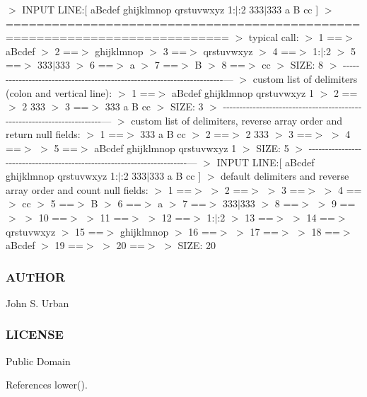 $>$ I\+N\+P\+UT L\+I\+NE\+:\mbox{[} a\+Bcdef ghijklmnop qrstuvwxyz 1\+:$\vert$\+:2 333$\vert$333 a B cc \mbox{]} $>$ =========================================================================== $>$ typical call\+: $>$ 1 ==$>$ a\+Bcdef $>$ 2 ==$>$ ghijklmnop $>$ 3 ==$>$ qrstuvwxyz $>$ 4 ==$>$ 1\+:$\vert$\+:2 $>$ 5 ==$>$ 333$\vert$333 $>$ 6 ==$>$ a $>$ 7 ==$>$ B $>$ 8 ==$>$ cc $>$ S\+I\+ZE\+: 8 $>$ -\/-\/-\/-\/-\/-\/-\/-\/-\/-\/-\/-\/-\/-\/-\/-\/-\/-\/-\/-\/-\/-\/-\/-\/-\/-\/-\/-\/-\/-\/-\/-\/-\/-\/-\/-\/-\/-\/-\/-\/-\/-\/-\/-\/-\/-\/-\/-\/-\/-\/-\/-\/-\/-\/-\/-\/-\/-\/-\/-\/-\/-\/-\/-\/-\/-\/-\/-\/-\/-\/-\/--- $>$ custom list of delimiters (colon and vertical line)\+: $>$ 1 ==$>$ a\+Bcdef ghijklmnop qrstuvwxyz 1 $>$ 2 ==$>$ 2 333 $>$ 3 ==$>$ 333 a B cc $>$ S\+I\+ZE\+: 3 $>$ -\/-\/-\/-\/-\/-\/-\/-\/-\/-\/-\/-\/-\/-\/-\/-\/-\/-\/-\/-\/-\/-\/-\/-\/-\/-\/-\/-\/-\/-\/-\/-\/-\/-\/-\/-\/-\/-\/-\/-\/-\/-\/-\/-\/-\/-\/-\/-\/-\/-\/-\/-\/-\/-\/-\/-\/-\/-\/-\/-\/-\/-\/-\/-\/-\/-\/-\/-\/-\/-\/-\/--- $>$ custom list of delimiters, reverse array order and return null fields\+: $>$ 1 ==$>$ 333 a B cc $>$ 2 ==$>$ 2 333 $>$ 3 ==$>$ $>$ 4 ==$>$ $>$ 5 ==$>$ a\+Bcdef ghijklmnop qrstuvwxyz 1 $>$ S\+I\+ZE\+: 5 $>$ -\/-\/-\/-\/-\/-\/-\/-\/-\/-\/-\/-\/-\/-\/-\/-\/-\/-\/-\/-\/-\/-\/-\/-\/-\/-\/-\/-\/-\/-\/-\/-\/-\/-\/-\/-\/-\/-\/-\/-\/-\/-\/-\/-\/-\/-\/-\/-\/-\/-\/-\/-\/-\/-\/-\/-\/-\/-\/-\/-\/-\/-\/-\/-\/-\/-\/-\/-\/-\/-\/-\/--- $>$ I\+N\+P\+UT L\+I\+NE\+:\mbox{[} a\+Bcdef ghijklmnop qrstuvwxyz 1\+:$\vert$\+:2 333$\vert$333 a B cc \mbox{]} $>$ default delimiters and reverse array order and count null fields\+: $>$ 1 ==$>$ $>$ 2 ==$>$ $>$ 3 ==$>$ $>$ 4 ==$>$ cc $>$ 5 ==$>$ B $>$ 6 ==$>$ a $>$ 7 ==$>$ 333$\vert$333 $>$ 8 ==$>$ $>$ 9 ==$>$ $>$ 10 ==$>$ $>$ 11 ==$>$ $>$ 12 ==$>$ 1\+:$\vert$\+:2 $>$ 13 ==$>$ $>$ 14 ==$>$ qrstuvwxyz $>$ 15 ==$>$ ghijklmnop $>$ 16 ==$>$ $>$ 17 ==$>$ $>$ 18 ==$>$ a\+Bcdef $>$ 19 ==$>$ $>$ 20 ==$>$ $>$ S\+I\+ZE\+: 20 \subsubsection*{A\+U\+T\+H\+OR}

John S. Urban \subsubsection*{L\+I\+C\+E\+N\+SE}

Public Domain 

References lower().

